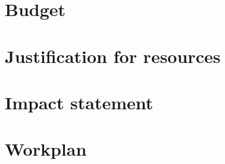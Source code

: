 \documentclass[a4paper,11pt]{article}
\begin{document}
    \newpage
    \section{Budget}

    \newpage
    \section{Justification for resources}

    \newpage
    \section{Impact statement}

    \newpage
    \section{Workplan}
\end{document}
